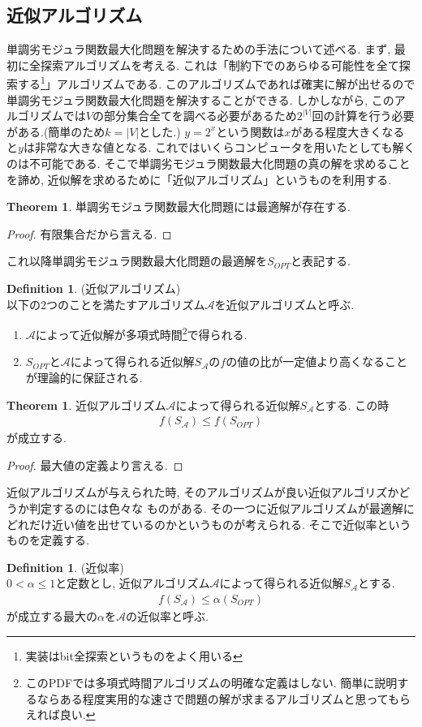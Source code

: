 \documentclass[11pt, a4paper, dvipdfmx]{jsbook}
\theoremstyle{definition}
\newtheorem{Definition+}[Axiom+]{Definition}
\newtheorem{Theorem+}[Axiom+]{Theorem}
\begin{document}
 \subsection{近似アルゴリズム}
単調劣モジュラ関数最大化問題を解決するための手法について述べる. 
まず, 最初に全探索アルゴリズムを考える. これは「制約下でのあらゆる可能性を全て探索する\footnote{実装はbit全探索というものをよく用いる}」アルゴリズムである. 
このアルゴリズムであれば確実に解が出せるので単調劣モジュラ関数最大化問題を解決することができる. 
しかしながら, このアルゴリズムでは$V$の部分集合全てを調べる必要があるため$2^{|V|}$回の計算を行う必要がある.(簡単のため$k = |V|$とした.)
$y = 2^x$という関数は$x$がある程度大きくなると$y$は非常な大きな値となる. 
これではいくらコンピュータを用いたとしても解くのは不可能である. そこで単調劣モジュラ関数最大化問題の真の解を求めることを諦め,
近似解を求めるために「近似アルゴリズム」というものを利用する. 
\begin{Theorem+}
    単調劣モジュラ関数最大化問題には最適解が存在する.
\begin{proof}
    有限集合だから言える.
\end{proof}
これ以降単調劣モジュラ関数最大化問題の最適解を$S_{OPT}$と表記する.
\end{Theorem+}
\begin{Definition+}(近似アルゴリズム)\\
    以下の2つのことを満たすアルゴリズム$\mathcal{A}$を近似アルゴリズムと呼ぶ.
    \begin{enumerate}
        \item $\mathcal{A}$によって近似解が多項式時間\footnote{このPDFでは多項式時間アルゴリズムの明確な定義はしない. 簡単に説明するならある程度実用的な速さで問題の解が求まるアルゴリズムと思ってもらえれば良い. }で得られる.
        \item $S_{OPT}$と$\mathcal{A}$によって得られる近似解$S_{\mathcal{A}}$の$f$の値の比が一定値より高くなることが理論的に保証される.
    \end{enumerate}
\end{Definition+}
\begin{Theorem+}
    近似アルゴリズム$\mathcal{A}$によって得られる近似解$S_{\mathcal{A}}$とする. この時
    \begin{align*}
        f(S_{\mathcal{A}})\leq f(S_{OPT})
    \end{align*}
    が成立する.
    \begin{proof}
        最大値の定義より言える.
    \end{proof}
\end{Theorem+}
近似アルゴリズムが与えられた時, そのアルゴリズムが良い近似アルゴリズかどうか判定するのには色々な
ものがある. その一つに近似アルゴリズムが最適解にどれだけ近い値を出せているのかというものが考えられる. そこで近似率というものを定義する.
\begin{Definition+}(近似率)\\
    $ 0< \alpha \leq 1$と定数とし, 近似アルゴリズム$\mathcal{A}$によって得られる近似解$S_{\mathcal{A}}$とする. 
    \begin{align*}
        f(S_{\mathcal{A}})\leq \alpha(S_{OPT})
    \end{align*}
    が成立する最大の$\alpha$を$\mathcal{A}$の近似率と呼ぶ.
\end{Definition+}
\end{document}
